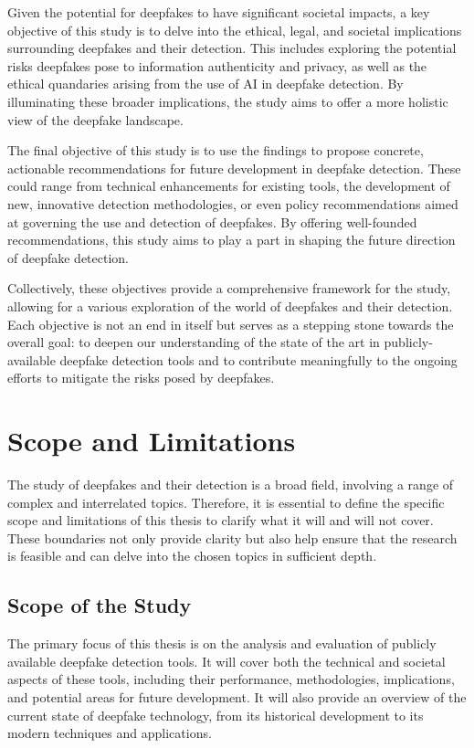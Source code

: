 Given the potential for deepfakes to have significant societal impacts, a key objective of this 
study is to delve into the ethical, legal, and societal implications surrounding deepfakes 
and their detection. This includes exploring the potential risks deepfakes pose to 
information authenticity and privacy, as well as the ethical quandaries arising from 
the use of AI in deepfake detection. By illuminating these broader implications, the 
study aims to offer a more holistic view of the deepfake landscape.

The final objective of this study is to use the findings to propose concrete, actionable 
recommendations for future development in deepfake detection. These could range from 
technical enhancements for existing tools, the development of new, innovative detection 
methodologies, or even policy recommendations aimed at governing the use and detection 
of deepfakes. By offering well-founded recommendations, this study aims to play a part 
in shaping the future direction of deepfake detection.

Collectively, these objectives provide a comprehensive framework for the study, allowing 
for a various exploration of the world of deepfakes and their detection. Each 
objective is not an end in itself but serves as a stepping stone towards the overall 
goal: to deepen our understanding of the state of the art in publicly-available deepfake 
detection tools and to contribute meaningfully to the ongoing efforts to mitigate the 
risks posed by deepfakes.

\section{Scope and Limitations}\label{chapter:scope}
The study of deepfakes and their detection is a broad field, involving a range of complex and 
interrelated topics. Therefore, it is essential to define the specific scope and 
limitations of this thesis to clarify what it will and will not cover. These boundaries 
not only provide clarity but also help ensure that the research is feasible and can delve 
into the chosen topics in sufficient depth.

\subsection{Scope of the Study}
The primary focus of this thesis is on the analysis and evaluation of publicly available 
deepfake detection tools. It will cover both the technical and societal aspects of these 
tools, including their performance, methodologies, implications, and potential areas for 
future development. It will also provide an overview of the current state of deepfake 
technology, from its historical development to its modern techniques and applications.

